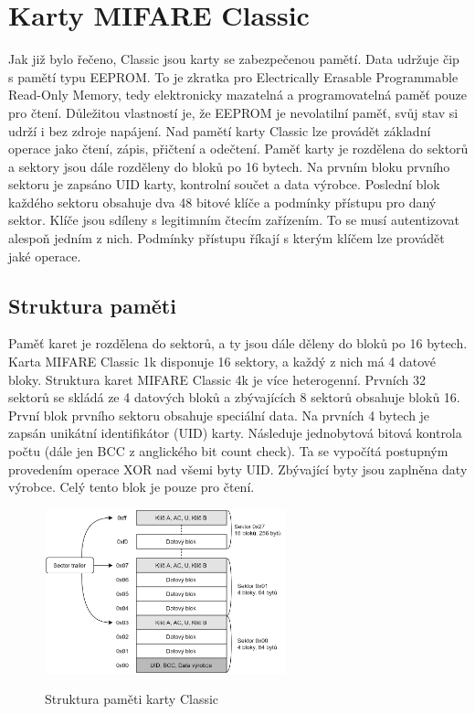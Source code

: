 \section{Karty MIFARE Classic}
Jak již bylo řečeno, Classic jsou karty se zabezpečenou pamětí. Data udržuje čip s pamětí typu EEPROM. To je zkratka pro Electrically Erasable Programmable {Read-Only} Memory, tedy elektronicky mazatelná a programovatelná paměť pouze pro čtení. Důležitou vlastností je, že EEPROM je nevolatilní paměť, svůj stav si udrží i bez zdroje napájení\cite{Smart_card_handbook}. Nad pamětí karty Classic lze provádět základní operace jako čtení, zápis, přičtení a odečtení. Paměť karty je rozdělena do sektorů a sektory jsou dále rozděleny do bloků po 16 bytech. Na prvním bloku prvního sektoru je zapsáno UID karty, kontrolní součet a data výrobce. Poslední blok každého sektoru obsahuje dva 48 bitové klíče a podmínky přístupu pro daný sektor. Klíče jsou sdíleny s legitimním čtecím zařízením. To se musí autentizovat alespoň jedním z nich. Podmínky přístupu říkají s kterým klíčem lze provádět jaké operace\cite{Dismantling_Mifare_Classic}\cite{Mifare_Classic_story}.
\par

\subsection{Struktura paměti} %
\label{sub:struktura_paměti}
Paměť karet je rozdělena do sektorů, a ty jsou dále děleny do bloků po 16 bytech. Karta MIFARE Classic 1k disponuje 16 sektory, a každý z nich má 4 datové bloky. Struktura karet MIFARE Classic 4k je více heterogenní. Prvních 32 sektorů se skládá ze 4 datových bloků a zbývajících 8 sektorů obsahuje bloků 16. První blok prvního sektoru obsahuje speciální data. Na prvních 4 bytech je zapsán unikátní identifikátor (UID) karty. Následuje jednobytová bitová kontrola počtu (dále jen BCC z anglického bit count check). Ta se vypočítá postupným provedením operace XOR nad všemi byty UID. Zbývající byty jsou zaplněna daty výrobce. Celý tento blok je pouze pro čtení. 

\begin{figure}[h]\centering
  \centering
  \hspace*{-0.07\linewidth}
  \includegraphics[width=0.6\linewidth,height=180px]{obrazky-figures/MemoryStructure.png}\\[1pt]  
  \caption{Struktura paměti karty Classic\cite{PracticalAttackOnMIFARE}}    
  \label{obrazekStrukturaPametiKarty}
\end{figure}

